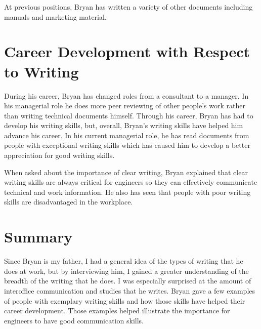\documentclass[11pt]{article}
\begin{document}
At previous positions, Bryan has written a variety of other documents including manuals and
marketing material.

\section{Career Development with Respect to Writing}

During his career, Bryan has changed roles from a consultant to a manager. In his managerial role he
does more peer reviewing of other people's work rather than writing technical documents himself.
Through his career, Bryan has had to develop his writing skills, but, overall, Bryan's writing
skills have helped him advance his career. In his current managerial role, he has read documents
from people with exceptional writing skills which has caused him to develop a better appreciation
for good writing skills.

When asked about the importance of clear writing, Bryan explained that clear writing skills are
always critical for engineers so they can effectively communicate technical and work information. He
also has seen that people with poor writing skills are disadvantaged in the workplace.

\section{Summary}

Since Bryan is my father, I had a general idea of the types of writing that he does at work, but
by interviewing him, I gained a greater understanding of the breadth of the writing that he does. I
was especially surprised at the amount of interoffice communication and studies that he writes.
Bryan gave a few examples of people with exemplary writing skills and how those skills have helped
their career development. Those examples helped illustrate the importance for engineers to have good
communication skills.

%
%
\end{document}

